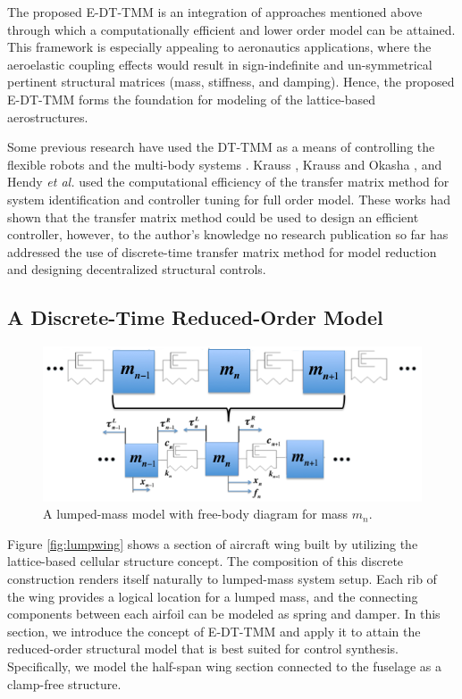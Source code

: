 \documentclass[11pt]{ucthesis}
\begin{document}
The proposed E-DT-TMM is an integration of approaches mentioned above through which a computationally efficient and lower order model can be attained. This framework is especially appealing to aeronautics applications, where the aeroelastic coupling effects would result in sign-indefinite and un-symmetrical pertinent structural matrices (mass, stiffness, and damping). Hence, the proposed E-DT-TMM forms the foundation for modeling of the lattice-based aerostructures.
 
Some previous research have used the DT-TMM as a means of controlling the flexible robots \cite{krauss2013discrete, krauss2011computationally} and the multi-body systems  \cite{rong2010discrete,rui2012discrete,hendy2014controller}. Krauss \cite{krauss2011computationally}, Krauss and Okasha \cite{krauss2013discrete}, and Hendy {\it et al.} \cite{hendy2014controller} used the computational efficiency of the transfer matrix method for system identification and controller tuning for full order model. These works had shown that the transfer matrix method could be used to design an efficient controller, however, to the author's knowledge no research publication so far has addressed the use of discrete-time transfer matrix method for model reduction and designing decentralized structural controls.

\subsection{A Discrete-Time Reduced-Order Model}
\label{sec:DTTMM}

\begin{figure}[thpb]
\centering
\includegraphics[width=1\linewidth]{Figures/full_mass_n.png}
\caption{A lumped-mass model with free-body diagram for mass $m_n$.}
\label{fig:gen}
\end{figure}

Figure \ref{fig:lumpwing} shows a section of aircraft wing built by utilizing the lattice-based cellular structure concept. The composition of this discrete construction renders itself naturally to lumped-mass system setup. Each rib of the wing provides a logical location for a lumped mass, and the connecting components between each airfoil can be modeled as spring and damper. In this section, we introduce the concept of E-DT-TMM and apply it to attain the reduced-order structural model that is best suited for control synthesis. Specifically, we model the half-span wing section connected to the fuselage as a clamp-free structure. 
\end{document}
